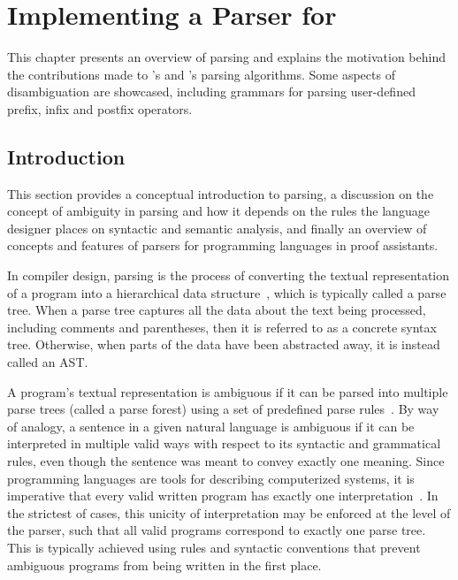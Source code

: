 \chapter{Implementing a Parser for \Beluga}

This chapter presents an overview of parsing and explains the motivation behind the contributions made to \Beluga's and \Harpoon's parsing algorithms.
Some aspects of disambiguation are showcased, including grammars for parsing user-defined prefix, infix and postfix operators.

\section{Introduction}

This section provides a conceptual introduction to parsing, a discussion on the concept of ambiguity in parsing and how it depends on the rules the language designer places on syntactic and semantic analysis, and finally an overview of concepts and features of parsers for programming languages in proof assistants.


In compiler design, parsing is the process of converting the textual representation of a program into a hierarchical data structure~\cite{aho2007compilers, afroozeh2019practical}, which is typically called a parse tree.
When a parse tree captures all the data about the text being processed, including comments and parentheses, then it is referred to as a concrete syntax tree.
Otherwise, when parts of the data have been abstracted away, it is instead called an \ac{AST}.


A program's textual representation is ambiguous if it can be parsed into multiple parse trees (called a parse forest) using a set of predefined parse rules~\cite{aho2007compilers}.
By way of analogy, a sentence in a given natural language is ambiguous if it can be interpreted in multiple valid ways with respect to its syntactic and grammatical rules, even though the sentence was meant to convey exactly one meaning.
Since programming languages are tools for describing computerized systems, it is imperative that every valid written program has exactly one interpretation~\cite{aho2007compilers}.
In the strictest of cases, this unicity of interpretation may be enforced at the level of the parser, such that all valid programs correspond to exactly one parse tree.
This is typically achieved using rules and syntactic conventions that prevent ambiguous programs from being written in the first place.

